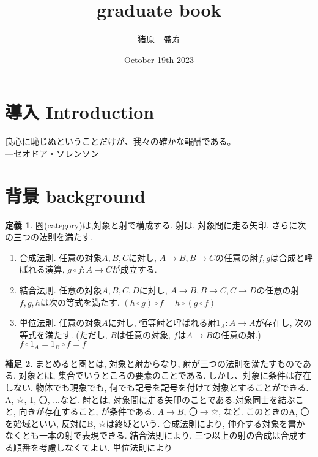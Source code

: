\documentclass{article}
\title{graduate book}
\author{猪原　盛寿}
\date{October 19th 2023}
\theoremstyle{definition}
\newtheorem{dfn}{定義}[section]
\newtheorem{hsk}[dfn]{補足}
\begin{document}
\Large
\maketitle

\section{導入 Introduction}
良心に恥じぬということだけが、我々の確かな報酬である。\\
---セオドア・ソレンソン
\section{背景 background}

\begin{dfn}
圏(category)は,対象と射で構成する. 射は, 対象間に走る矢印. さらに次の三つの法則を満たす.
\begin{enumerate}[(1)]
    \item 合成法則. 任意の対象$A, B, C$に対し, $A\rightarrow B, B\rightarrow C$の任意の射$f, g$は合成と呼ばれる演算, $g \circ f: A\rightarrow C$が成立する.
    \item 結合法則. 任意の対象$A, B, C, D$に対し, $A\rightarrow B, B\rightarrow C, C\rightarrow D$の任意の射$f, g, h$は次の等式を満たす. $(h \circ g) \circ f = h \circ (g \circ f)$  
    \item 単位法則. 任意の対象$A$に対し, 恒等射と呼ばれる射$1_A:A\rightarrow A$が存在し, 次の等式を満たす. (ただし, $B$は任意の対象, $f$は$A\rightarrow B$の任意の射.) $f\circ 1_A = 1_B\circ f = f$  \\
\end{enumerate}
\end{dfn}

\begin{hsk}
まとめると圏とは, 対象と射からなり, 射が三つの法則を満たすものである.
対象とは, 集合でいうところの要素のことである. しかし、対象に条件は存在しない. 物体でも現象でも, 何でも記号を記号を付けて対象とすることができる. A, ☆, 1, 〇, ...など. 
射とは, 対象間に走る矢印のことである.対象同士を結ぶこと, 向きが存在すること, が条件である. $A \rightarrow B$, 〇$\rightarrow$☆, など. このときのA, 〇を始域といい, 反対にB, ☆は終域という.
合成法則により, 仲介する対象を書かなくとも一本の射で表現できる. 結合法則により, 三つ以上の射の合成は合成する順番を考慮しなくてよい. 単位法則により\\
\end{hsk}
\end{document}

